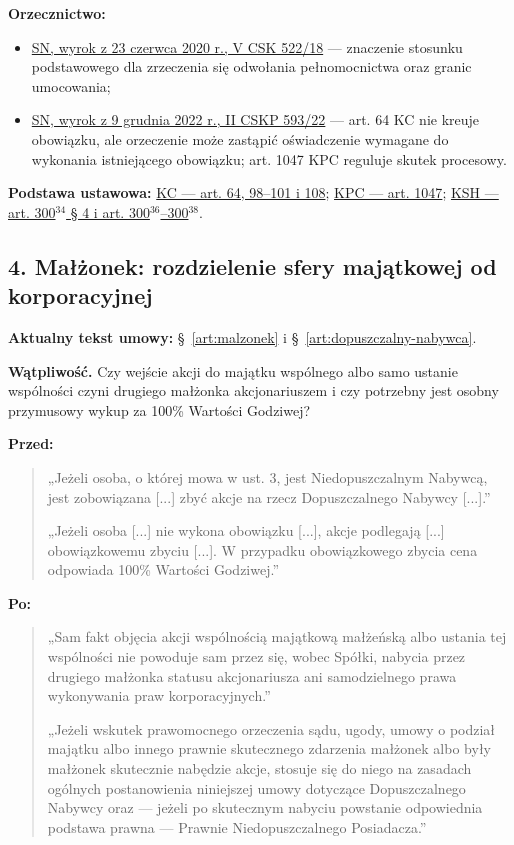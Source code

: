 \documentclass[12pt,a4paper]{report}
\begin{document}
\textbf{Orzecznictwo:}
\begin{itemize}
  \item \href{https://www.sn.pl/sites/orzecznictwo/OrzeczeniaHTML/v\%20csk\%20522-18-1.docx.html}{SN, wyrok z 23 czerwca 2020 r., V CSK 522/18} --- znaczenie stosunku podstawowego dla zrzeczenia się odwołania pełnomocnictwa oraz granic umocowania;
  \item \href{https://www.sn.pl/sites/orzecznictwo/OrzeczeniaHTML/ii\%20cskp\%20593-22.docx.html}{SN, wyrok z 9 grudnia 2022 r., II CSKP 593/22} --- art. 64 KC nie kreuje obowiązku, ale orzeczenie może zastąpić oświadczenie wymagane do wykonania istniejącego obowiązku; art. 1047 KPC reguluje skutek procesowy.
\end{itemize}

\textbf{Podstawa ustawowa:} \href{https://eli.gov.pl/eli/DU/2026/795/ogl}{KC --- art. 64, 98--101 i 108}; \href{https://eli.gov.pl/eli/DU/2026/468/ogl}{KPC --- art. 1047}; \href{https://eli.gov.pl/api/acts/DU/2024/18/text.html}{KSH --- art. 300$^{34}$ § 4 i art. 300$^{36}$--300$^{38}$}.

\subsection*{4. Małżonek: rozdzielenie sfery majątkowej od korporacyjnej}
\textbf{Aktualny tekst umowy:} §~\ref{art:malzonek} i §~\ref{art:dopuszczalny-nabywca}.

\textbf{Wątpliwość.} Czy wejście akcji do majątku wspólnego albo samo ustanie wspólności czyni drugiego małżonka akcjonariuszem i czy potrzebny jest osobny przymusowy wykup za 100\% Wartości Godziwej?

\textbf{Przed:}
\begin{quote}\small
„Jeżeli osoba, o której mowa w ust. 3, jest Niedopuszczalnym Nabywcą, jest zobowiązana [...] zbyć akcje na rzecz Dopuszczalnego Nabywcy [...].”

„Jeżeli osoba [...] nie wykona obowiązku [...], akcje podlegają [...] obowiązkowemu zbyciu [...]. W przypadku obowiązkowego zbycia cena odpowiada 100\% Wartości Godziwej.”
\end{quote}

\textbf{Po:}
\begin{quote}\small
„Sam fakt objęcia akcji wspólnością majątkową małżeńską albo ustania tej wspólności nie powoduje sam przez się, wobec Spółki, nabycia przez drugiego małżonka statusu akcjonariusza ani samodzielnego prawa wykonywania praw korporacyjnych.”

„Jeżeli wskutek prawomocnego orzeczenia sądu, ugody, umowy o podział majątku albo innego prawnie skutecznego zdarzenia małżonek albo były małżonek skutecznie nabędzie akcje, stosuje się do niego na zasadach ogólnych postanowienia niniejszej umowy dotyczące Dopuszczalnego Nabywcy oraz --- jeżeli po skutecznym nabyciu powstanie odpowiednia podstawa prawna --- Prawnie Niedopuszczalnego Posiadacza.”
\end{quote}
\end{document}
